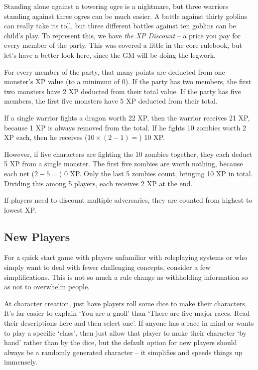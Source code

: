 Standing alone against a towering ogre is a nightmare, but three warriors standing against three ogres can be much easier.  A battle against thirty goblins can really take its toll, but three different battles against ten goblins can be child's play.  To represent this, we have \textit{the XP Discount} -- a price you pay for every member of the party.  This was covered a little in the core rulebook, but let's have a better look here, since the GM will be doing the legwork.

For every member of the party, that many points are deducted from one monster's XP value (to a minimum of 0).  If the party has two members, the first two monsters have 2 XP deducted from their total value.  If the party has five members, the first five monsters have 5 XP deducted from their total.

If a single warrior fights a dragon worth 22 XP, then the warrior receives 21 XP, because 1 XP is always removed from the total.  If he fights 10 zombies worth 2 XP each, then he receives ($10 \times (2 - 1) =$) 10 XP.

However, if five characters are fighting the 10 zombies together, they each deduct 5 XP from a single monster.  The first five zombies are worth nothing, because each net ($2 - 5 = $) 0 XP.  Only the last 5 zombies count, bringing 10 XP in total.  Dividing this among 5 players, each receives 2 XP at the end.

If players need to discount multiple adversaries, they are counted from highest to lowest XP.

\subsection{New Players}

For a quick start game with players unfamiliar with roleplaying systems or who simply want to deal with fewer challenging concepts, consider a few simplifications. This is not so much a rule change as withholding information so as not to overwhelm people.

At character creation, just have players roll some dice to make their characters.  It's far easier to explain `You are a gnoll' than `There are five major races.  Read their descriptions here and then select one'.  If anyone has a race in mind or wants to play a specific `class', then just allow that player to make their character `by hand' rather than by the dice, but the default option for new players should always be a randomly generated character -- it simplifies and speeds things up  immensely.

